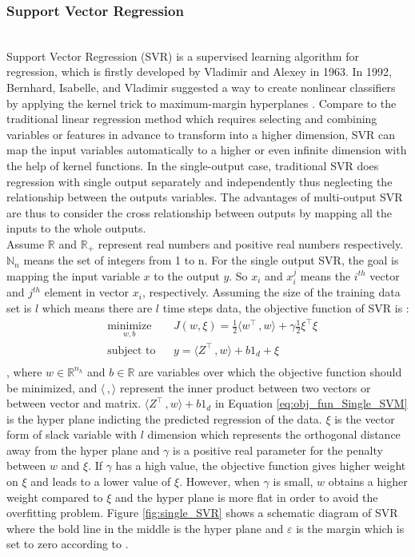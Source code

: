 \subsubsection{Support Vector Regression}
\\Support Vector Regression (SVR) is a supervised learning algorithm for regression, which is firstly developed by Vladimir and Alexey in 1963. In 1992, Bernhard, Isabelle, and Vladimir suggested a way to create nonlinear classifiers by applying the kernel trick to maximum-margin hyperplanes \cite{bennett2000support}. Compare to the traditional linear regression method which requires selecting and combining variables or features in advance to transform into a higher dimension, SVR can map the input variables automatically to a higher or even infinite dimension with the help of kernel functions. In the single-output case, traditional SVR does regression with single output separately and independently thus neglecting the relationship between the outputs variables. The advantages of multi-output SVR are thus to consider the cross relationship between outputs by mapping all the inputs to the whole outputs.
\bigskip
\\Assume $\mathbb{R}$ and $\mathbb{R}_+$ represent real numbers and positive real numbers respectively. $\mathbb{N}_n$ means the set of integers from 1 to n. For the single output SVR, the goal is mapping the input variable $x$ to the output $y$. So $x_i$ and $x_i^j$  means the $i^{th}$ vector and $j^{th}$ element in vector $x_i$, respectively. Assuming the size of the training data set is $l$ which means there are $l$ time steps data, the objective function of SVR is \cite{xu2013multi}:
\begin{equation}
    \begin{aligned}
    & \underset{ w,b}{\text{minimize}}
    & & J(w, \xi)= \frac{1}{2} \langle w^{\intercal} \,, w \rangle +\gamma \frac{1}{2} \xi^{\intercal} \xi \\
    & \text{subject to}
    & & y = \langle  Z^{\intercal} \,, w \rangle + b 1_d+\xi\\
    \label{eq:obj_fun_Single_SVM}
    \end{aligned}
\end{equation}
, where $w \in \mathbb{R}^{n_h}$ and $b \in \mathbb{R}$ are variables over which the objective function should be minimized, and $\langle \,, \rangle$ represent the inner product between two vectors or between vector and matrix. $\langle  Z^{\intercal} \,, w \rangle + b 1_d $ in Equation \ref{eq:obj_fun_Single_SVM} is the hyper plane indicting the predicted regression of the data. $\xi$ is the vector form of slack variable with $l$ dimension which represents the orthogonal distance away from the hyper plane and $\gamma$ is a positive real parameter for the penalty between $w$ and $\xi$. If $\gamma$ has a high value, the objective function gives higher weight on $\xi$ and leads to a lower value of $\xi$. However, when $\gamma$ is small, $w$ obtains a higher weight compared to $\xi$ and the hyper plane is more flat in order to avoid the overfitting problem. Figure \ref{fig:single_SVR} shows a schematic diagram of SVR where the bold line in the middle is the hyper plane and $\varepsilon$ is the margin which is set to zero according to \cite{xu2013multi}.
